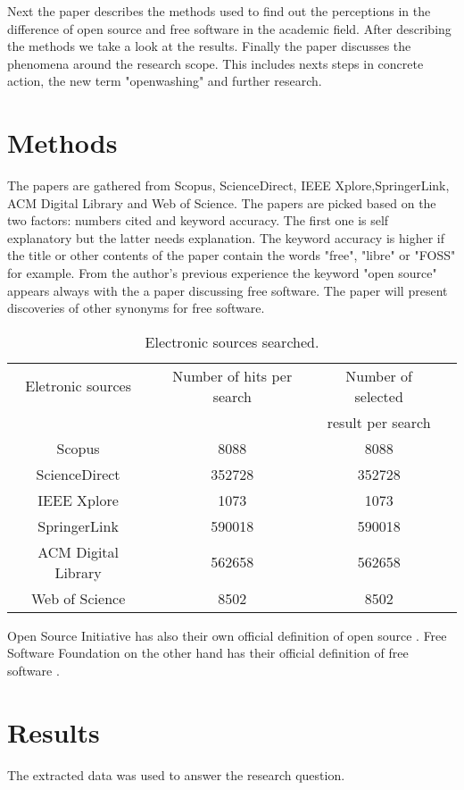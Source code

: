 \documentclass[conference]{IEEEtran}
\begin{document}
Next the paper describes the methods used to find out the perceptions in the difference of open source and free software in the academic field. After describing the methods we take a look at the results. Finally the paper discusses the phenomena around the research scope. This includes nexts steps in concrete action, the new term "openwashing" and further research.

\section{Methods}
The papers are gathered from Scopus, ScienceDirect, IEEE Xplore,SpringerLink, ACM Digital Library and Web of Science. The papers are picked based on the two factors: numbers cited and keyword accuracy. The first one is self explanatory but the latter needs explanation. The keyword accuracy is higher if the title or other contents of the paper contain the words "free", "libre" or "FOSS" for example. From the author's previous experience the keyword "open source" appears always with the a paper discussing free software. The paper will present discoveries of other synonyms for free software.

\begin{table}[htbp]
	\caption{Electronic sources searched.}
	\begin{center}
		\begin{tabular}{|c|c|c|c|}
			\hline
				Eletronic sources & Number of hits per search & Number of selected\\
				&& result per search\\
			\hline
			Scopus & 8088 &  8088\\
			ScienceDirect & 352728 & 352728\\
			IEEE Xplore & 1073 & 1073\\
			SpringerLink & 590018 & 590018\\
			ACM Digital Library & 562658 & 562658\\
			Web of Science & 8502 & 8502\\
			\hline
		\end{tabular}
		\label{tab1}
	\end{center}
\end{table}

Open Source Initiative has also their own official definition of open source \cite{osd}. Free Software Foundation on the other hand has their official definition of free software \cite{fsd}.

\section{Results}
The extracted data was used to answer the research question.
\end{document}

